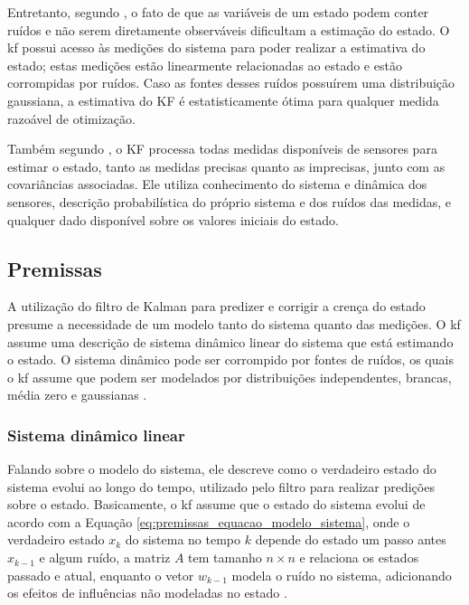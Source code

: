 \documentclass[acronym, symbols, table, deposito]{fei}
\begin{document}
			Entretanto, segundo \textcite{phdthesisNegenborn}, o fato de que as variáveis de um estado podem conter ruídos e não serem diretamente observáveis dificultam a estimação do estado. O \acrshort{kf} possui acesso às medições do sistema para poder realizar a estimativa do estado; estas medições estão linearmente relacionadas ao estado e estão corrompidas por ruídos. Caso as fontes desses ruídos possuírem uma distribuição gaussiana, a estimativa do KF é estatisticamente ótima para qualquer medida razoável de otimização.
			
			Também segundo \textcite{phdthesisNegenborn}, o KF processa todas medidas disponíveis de sensores para estimar o estado, tanto as medidas precisas quanto as imprecisas, junto com as covariâncias associadas. Ele utiliza conhecimento do sistema e dinâmica dos sensores, descrição probabilística do próprio sistema e dos ruídos das medidas, e qualquer dado disponível sobre os valores iniciais do estado.
			
		\subsection{Premissas}
		
			A utilização do filtro de Kalman para predizer e corrigir a crença do estado presume a necessidade de um modelo tanto do sistema quanto das medições. O \acrshort{kf} assume uma descrição de sistema dinâmico linear do sistema que está estimando o estado. O sistema dinâmico pode ser corrompido por fontes de ruídos, os quais o \acrshort{kf} assume que podem ser modelados por distribuições independentes, brancas, média zero e gaussianas \cite{urrea2021kalman}.
			
			\subsubsection{Sistema dinâmico linear}
			
				Falando sobre o modelo do sistema, ele descreve como o verdadeiro estado do sistema evolui ao longo do tempo, utilizado pelo filtro para realizar predições sobre o estado. Basicamente, o \acrshort{kf} assume que o estado do sistema evolui de acordo com a Equação \eqref{eq:premissas_equacao_modelo_sistema}, onde o verdadeiro estado $x_k$ do sistema no tempo $k$ depende do estado um passo antes $x_{k-1}$ e algum ruído, a matriz $A$ tem tamanho $n \times n$ e relaciona os estados passado e atual, enquanto o vetor $w_{k-1}$ modela o ruído no sistema, adicionando os efeitos de influências não modeladas no estado \cite{urrea2021kalman}.
				
\end{document}
